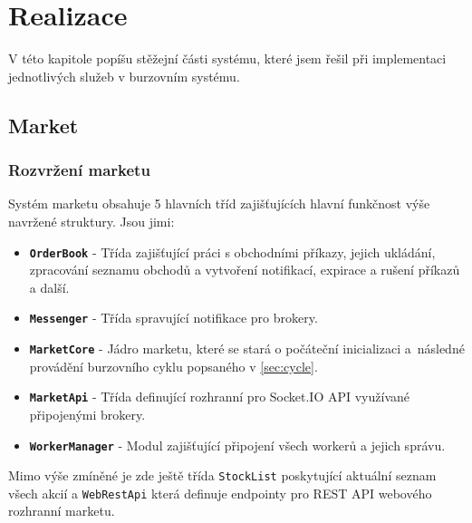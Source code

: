 \documentclass[thesis=M,czech]{FITthesis}[2012/06/26]
\begin{document}

\chapter{Realizace}
\label{chap:realization}

	V této kapitole popíšu stěžejní části systému, které jsem řešil při implementaci jednotlivých služeb v burzovním systému.

\section{Market}

\subsection{Rozvržení marketu}

	Systém marketu obsahuje 5 hlavních tříd zajišťujících hlavní funkčnost výše navržené struktury. Jsou jimi:
	
\begin{itemize}

\item \textbf{\texttt{OrderBook}} - Třída zajišťující práci s obchodními příkazy, jejich ukládání, zpracování seznamu obchodů a vytvoření notifikací, expirace a rušení příkazů a další.

\item \textbf{\texttt{Messenger}} - Třída spravující notifikace pro brokery.

\item \textbf{\texttt{MarketCore}} - Jádro marketu, které se stará o počáteční inicializaci a~následné provádění burzovního cyklu popsaného v \ref{sec:cycle}.

\item \textbf{\texttt{MarketApi}} - Třída definující rozhranní pro Socket.IO API využívané připojenými brokery.

\item \textbf{\texttt{WorkerManager}} - Modul zajišťující připojení všech workerů a jejich správu.

\end{itemize}

	Mimo výše zmíněné je zde ještě třída \texttt{StockList} poskytující aktuální seznam všech akcií a \texttt{WebRestApi} která definuje endpointy pro REST API webového rozhranní marketu.
\end{document}
